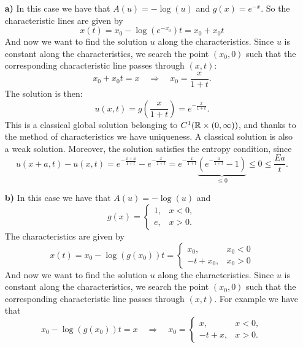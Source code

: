 \begin{itemize}
    \item[\textbf{a)}]
          In this case we have that \(A(u) = -\log(u)\) and \(g(x) = e^{-x}\).
          So the characteristic lines are given by
          \[
              x(t) = x_0 - \log(e^{-x_0})t = x_0 + x_0 t
          \]
          And now we want to find the solution $u$ along the characteristics. Since $u$ is
          constant along the characteristics, we search the point \((x_0,0)\) such that
          the corresponding characteristic line passes through \((x,t)\):
          \[
              x_0 + x_0 t = x \quad \Rightarrow \quad x_0 = \frac{x}{1+t}.
          \]
          The solution is then:
          \[
              u(x,t) = g\left(\frac{x}{1+t}\right) = e^{-\frac{x}{1+t}}.
          \]
          This is a classical global solution belonging to \(C^1(\mathbb{R} \times (0,
          \infty))\), and thanks to the method of characteristics we have uniqueness. A
          classical solution is also a weak solution. Moreover, the solution satisfies
          the entropy condition, since
          \[
              u(x+a,t)-u(x,t) = e^{-\frac{x+a}{1+t}} - e^{-\frac{x}{1+t}} = e^{-\frac{x}{1+t}} \underbrace{\left(e^{-\frac{a}{1+t}}-1\right)}_{\leq 0} \leq 0 \leq \frac{Ea}{t}.
          \]
    \item[\textbf{b)}]
          In this case we have that \(A(u) = -\log(u)\) and \[g(x) = \begin{cases}
                  1, & x < 0, \\
                  e, & x > 0.
              \end{cases}\]
          The characteristics are given by
          \[
              x(t) = x_0 - \log(g(x_0))t = \begin{cases}
                  x_0,      & x_0 < 0 \\
                  -t + x_0, & x_0 > 0
              \end{cases}
          \]
          And now we want to find the solution $u$ along the characteristics. Since $u$
          is constant along the characteristics, we search the point \((x_0,0)\) such
          that the corresponding characteristic line passes through \((x,t)\). For
          example we have that
          \[
              x_0 - \log(g(x_0))t = x \quad \Rightarrow \quad x_0 = \begin{cases}
                  x,      & x < 0, \\
                  -t + x, & x > 0.
              \end{cases}
\]
\end{itemize}
